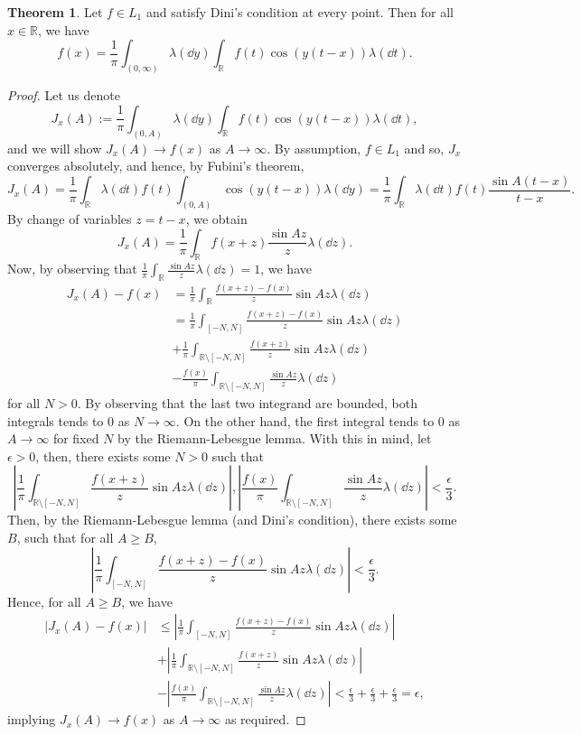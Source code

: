\documentclass[]{article}
\theoremstyle{definition}
\newtheorem{theorem}{Theorem}
\theoremstyle{definition}
\begin{document}
\begin{theorem}
  Let \(f \in L_1\) and satisfy Dini's condition at every point. Then for all 
  \(x \in \mathbb{R}\), we have
  \[f(x) = \frac{1}{\pi} \int_{(0, \infty)} \lambda(\dd y) \int_{\mathbb{R}} f(t) \cos(y(t - x)) \lambda(\dd t).\]
\end{theorem}
\begin{proof}
  Let us denote 
  \[J_x(A) := \frac{1}{\pi} \int_{(0, A)} \lambda(\dd y) \int_{\mathbb{R}} f(t) \cos(y(t - x)) \lambda(\dd t),\]
  and we will show \(J_x(A) \to f(x)\) as \(A \to \infty\). By assumption, \(f \in L_1\) 
  and so, \(J_x\) converges absolutely, and hence, by Fubini's theorem, 
  \[J_x(A) = \frac{1}{\pi} \int_{\mathbb{R}} \lambda(\dd t) f(t) \int_{(0, A)} \cos(y(t - x)) \lambda(\dd y)
    = \frac{1}{\pi} \int_{\mathbb{R}} \lambda(\dd t) f(t) \frac{\sin A(t - x)}{t - x}.\]
  By change of variables \(z = t - x\), we obtain 
  \[J_x(A) = \frac{1}{\pi}\int_{\mathbb{R}} f(x + z) \frac{\sin Az}{z} \lambda (\dd z).\]
  Now, by observing that \(\frac{1}{\pi}\int_{\mathbb{R}} \frac{\sin Az}{z} \lambda(\dd z) = 1\), 
  we have 
  \[\begin{split}
    J_x(A) - f(x) & = \frac{1}{\pi} \int_{\mathbb{R}} \frac{f(x + z) - f(x)}{z} \sin Az \lambda(\dd z)\\
    & = \frac{1}{\pi} \int_{[-N, N]} \frac{f(x + z) - f(x)}{z} \sin Az \lambda(\dd z)\\
    & + \frac{1}{\pi} \int_{\mathbb{R} \setminus [-N, N]} \frac{f(x + z)}{z} \sin Az \lambda(\dd z)\\
    & - \frac{f(x)}{\pi} \int_{\mathbb{R} \setminus [-N, N]} \frac{\sin Az}{z} \lambda(\dd z)
  \end{split}\]
  for all \(N > 0\). By observing that the last two integrand are bounded, both 
  integrals tends to 0 as \(N \to \infty\). On the other hand, the first integral 
  tends to 0 as \(A \to \infty\) for fixed \(N\) by the Riemann-Lebesgue lemma. 
  With this in mind, let \(\epsilon > 0\), then, there exists some \(N > 0\) 
  such that 
  \[\left|\frac{1}{\pi} \int_{\mathbb{R} \setminus [-N, N]} \frac{f(x + z)}{z} \sin Az \lambda(\dd z)\right|,
    \left|\frac{f(x)}{\pi} \int_{\mathbb{R} \setminus [-N, N]} \frac{\sin Az}{z} \lambda(\dd z)\right| < \frac{\epsilon}{3}.\]
  Then, by the Riemann-Lebesgue lemma (and Dini's condition), there exists some 
  \(B\), such that for all \(A \ge B\), 
  \[\left|\frac{1}{\pi} \int_{[-N, N]} \frac{f(x + z) - f(x)}{z} \sin Az \lambda(\dd z)\right| < \frac{\epsilon}{3}.\]
  Hence, for all \(A \ge B\), we have
  \[\begin{split}
    |J_x(A) - f(x)| & \le 
        \left|\frac{1}{\pi} \int_{[-N, N]} \frac{f(x + z) - f(x)}{z} \sin Az \lambda(\dd z)\right|\\
    & + \left|\frac{1}{\pi} \int_{\mathbb{R} \setminus [-N, N]} \frac{f(x + z)}{z} \sin Az \lambda(\dd z)\right|\\
    & - \left|\frac{f(x)}{\pi} \int_{\mathbb{R} \setminus [-N, N]} \frac{\sin Az}{z} \lambda(\dd z)\right|
      < \frac{\epsilon}{3} + \frac{\epsilon}{3} + \frac{\epsilon}{3} = \epsilon,
  \end{split}\]
  implying \(J_x(A) \to f(x)\) as \(A \to \infty\) as required.
\end{proof}
\end{document}
